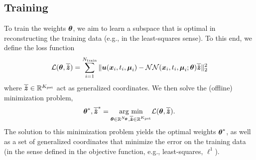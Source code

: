 \documentclass[3p,computermodern,10pt]{elsarticle}
\begin{document}
\subsection{Training}
To train the weights $\boldsymbol \theta$, we aim to learn a subspace that is optimal in reconstructing the training data (e.g., in the least-squares sense). To this end, we define the loss function 
$$\mathcal{L}(\boldsymbol \theta,\overline{\hat{\boldsymbol z}}) = \sum_{i=1}^{N_{\text{train}}} \| \boldsymbol u(\boldsymbol x_i,t_i,\boldsymbol \mu_i) - \mathcal{NN}(\boldsymbol x_i,t_i,\boldsymbol \mu_i;\boldsymbol \theta) \overline{\hat{\boldsymbol z}} \|_2^2$$  
where $\overline{\hat{\boldsymbol z}} \in \mathbb{R}^{K_{\text{pst}}}$ act as generalized coordinates. We then solve the (offline) minimization problem,
$$\boldsymbol \theta^*,\overline{\hat{\boldsymbol z}}^* = \underset{ \boldsymbol \theta \in \mathbb{R}^{N_{\boldsymbol \theta}},\overline{\hat{\boldsymbol z}} \in \mathbb{R}^{K_{\text{pst}}}}{\text{arg min}} \mathcal{L}(\boldsymbol \theta,\overline{\hat{\boldsymbol z}}).$$ 
The solution to this minimization problem yields the optimal weights $\boldsymbol \theta^*$, as well as a set of generalized coordinates that minimize the error on the training data (in the sense defined in the objective function, e.g., least-squares, $\ell^1$).
\end{document}
